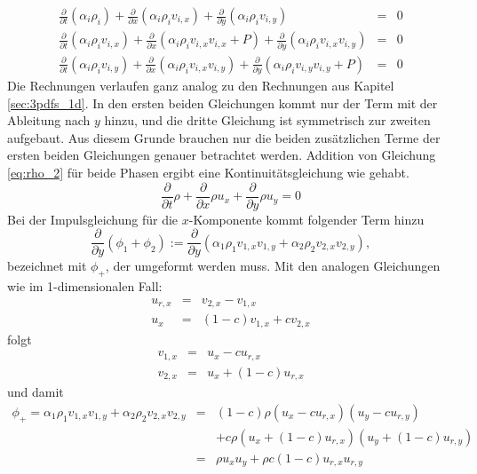 \begin{eqnarray}
\frac{\partial }{\partial t} (\alpha_i \rho_i) + 
\frac{\partial }{\partial x} (\alpha_i\rho_i v_{i,x}) +
\frac{\partial }{\partial y} (\alpha_i\rho_i v_{i,y}) &=& 0 \label{eq:rho_2}\\
%
\frac{\partial }{\partial t} (\alpha_i\rho_i v_{i,x}) +
\frac{\partial }{\partial x} (\alpha_i\rho_i v_{i,x}v_{i,x} + P) +
\frac{\partial }{\partial y} (\alpha_i\rho_i v_{i,x} v_{i,y}) &=& 0 \\
%
\frac{\partial }{\partial t} (\alpha_i\rho_i v_{i,y}) +
\frac{\partial }{\partial x} (\alpha_i\rho_i v_{i,x} v_{i,y}) +
\frac{\partial }{\partial y} (\alpha_i\rho_i v_{i,y}v_{i,y} + P)  &=& 0 
\end{eqnarray}
Die Rechnungen verlaufen ganz analog zu den Rechnungen aus Kapitel
\ref{sec:3pdfs_1d}. In den ersten beiden Gleichungen kommt nur der
Term mit der Ableitung nach $y$ hinzu, und die dritte Gleichung ist
symmetrisch zur zweiten aufgebaut. Aus diesem Grunde brauchen nur die
beiden zusätzlichen Terme der ersten beiden Gleichungen genauer
betrachtet werden. Addition von Gleichung \ref{eq:rho_2} für beide
Phasen ergibt eine Kontinuitätsgleichung wie gehabt.
\begin{equation}
\frac{\partial}{\partial t}\rho + \frac{\partial}{\partial x} \rho u_x
+ \frac{\partial}{\partial y} \rho u_y
=  0\label{eq:2d_simple_d}
\end{equation}
Bei der Impulsgleichung für die $x$-Komponente kommt folgender Term
hinzu
\[
\frac{\partial }{\partial y}(\phi_1+\phi_2):= \frac{\partial
}{\partial y} \left(\alpha_1\rho_1 v_{1,x} v_{1,y} + \alpha_2\rho_2
v_{2,x} v_{2,y}\right),
\]
bezeichnet mit $\phi_+$, der umgeformt werden
muss. Mit den analogen Gleichungen wie im 1-dimensionalen Fall:
\begin{eqnarray*}
u_{r,x} &=& v_{2,x}-v_{1,x}\\
u_x    &=& (1-c) v_{1,x} + c v_{2,x}
\end{eqnarray*}
folgt
\begin{eqnarray*}
v_{1,x} &=& u_{x}-c u_{r,x}\\
v_{2,x} &=& u_x + (1-c) u_{r,x}
\end{eqnarray*}
und damit
\begin{eqnarray*}
 \phi_+ = \alpha_1\rho_1 v_{1,x} v_{1,y} +
  \alpha_2\rho_2 v_{2,x} v_{2,y} &=& (1-c)\rho \left( u_{x}-c u_{r,x} \right)
\left( u_{y}-c u_{r,y} \right)\\
%
&& + c\rho \left( u_x + (1-c) u_{r,x} \right) \left( u_y + (1-c) u_{r,y} \right) \\
&=& \rho u_x u_y + \rho c(1-c) u_{r,x} u_{r,y} 
\end{eqnarray*}
